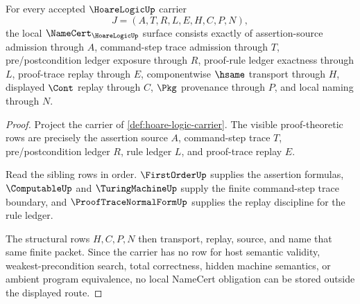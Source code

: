 \begin{theorem}
\label{thm:hoare-logic-namecert-obligations}
For every accepted $\HoareLogicUp$ carrier
$$
J=(A,T,R,L,E,H,C,P,N),
$$
the local $\NameCert_{\HoareLogicUp}$ surface consists exactly of assertion-source admission through $A$, command-step trace admission through $T$, pre/postcondition ledger exposure through $R$, proof-rule ledger exactness through $L$, proof-trace replay through $E$, componentwise $\hsame$ transport through $H$, displayed $\Cont$ replay through $C$, $\Pkg$ provenance through $P$, and local naming through $N$.
\end{theorem}
\begin{proof}
Project the carrier of \autoref{def:hoare-logic-carrier}. The visible proof-theoretic rows are precisely the assertion source $A$, command-step trace $T$, pre/postcondition ledger $R$, rule ledger $L$, and proof-trace replay $E$.

Read the sibling rows in order. $\FirstOrderUp$ supplies the assertion formulas, $\ComputableUp$ and $\TuringMachineUp$ supply the finite command-step trace boundary, and $\ProofTraceNormalFormUp$ supplies the replay discipline for the rule ledger.

The structural rows $H,C,P,N$ then transport, replay, source, and name that same finite packet. Since the carrier has no row for host semantic validity, weakest-precondition search, total correctness, hidden machine semantics, or ambient program equivalence, no local NameCert obligation can be stored outside the displayed route.
\end{proof}

